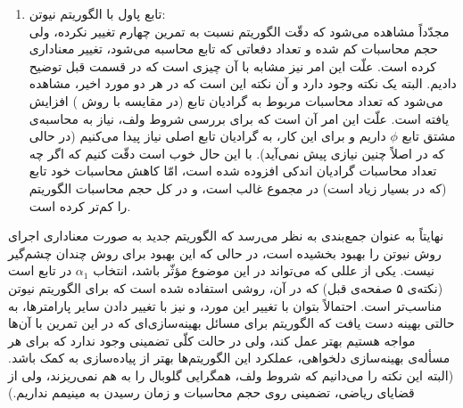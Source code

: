 \documentclass[a4paper]{article}
\theoremstyle{plain}
\theoremstyle{definition}
\theoremstyle{remark}
\begin{document}
\begin{enumerate}
	\item 
	تابع پاول با الگوریتم نیوتن:\\
	مجدّداً مشاهده می‌شود که دقّت الگوریتم نسبت به تمرین چهارم تغییر نکرده، ولی حجم محاسبات کم شده و تعداد دفعاتی که تابع محاسبه می‌شود، تغییر معناداری کرده است. علّت این امر نیز مشابه با آن چیزی است که در قسمت قبل توضیح دادیم. البته یک نکته وجود دارد و آن نکته این است که در هر دو مورد اخیر، مشاهده می‌شود که تعداد محاسبات مربوط به گرادیان تابع (در مقایسه با روش ) افزایش یافته است. علّت این امر آن است که برای بررسی شروط ولف، نیاز به محاسبه‌ی مشتق تابع $ \phi $ داریم و برای این کار، به گرادیان تابع اصلی نیاز پیدا می‌کنیم (در حالی که در  اصلاً چنین نیازی پیش نمی‌آید). با این حال خوب است دقّت کنیم که اگر چه تعداد محاسبات گرادیان اندکی افزوده شده است، امّا کاهش محاسبات خود تابع (که در  بسیار زیاد است) در مجموع غالب است، و در کل حجم محاسبات الگوریتم را کم‌تر کرده است.
\end{enumerate} 
نهایتاً‌ به عنوان جمع‌بندی به نظر می‌رسد که الگوریتم جدید به صورت معناداری اجرای روش نیوتن را بهبود بخشیده است، در حالی که این بهبود برای روش  چندان چشم‌گیر نیست. یکی از عللی که می‌تواند در این موضوع مؤثّر باشد، انتخاب $ \alpha_1 $ در تابع  است (نکته‌ی ۵ صفحه‌ی قبل) که در آن، روشی استفاده شده است که برای الگوریتم نیوتن مناسب‌تر است. احتمالاً بتوان با تغییر این مورد، و نیز با تغییر دادن سایر پارامترها، به حالتی بهینه دست یافت که الگوریتم برای مسائل بهینه‌سازی‌ای که در این تمرین با آن‌ها مواجه هستیم بهتر عمل کند، ولی در حالت کلّی تضمینی وجود ندارد که برای هر مسأله‌ی بهینه‌سازی دلخواهی، عملکرد این الگوریتم‌ها بهتر از پیاده‌سازی به کمک  باشد. (البته این نکته را می‌دانیم که شروط ولف، همگرایی گلوبال را به هم نمی‌ریزند، ولی از قضایای ریاضی، تضمینی روی حجم محاسبات و زمان رسیدن به مینیمم نداریم.)
\end{document}
